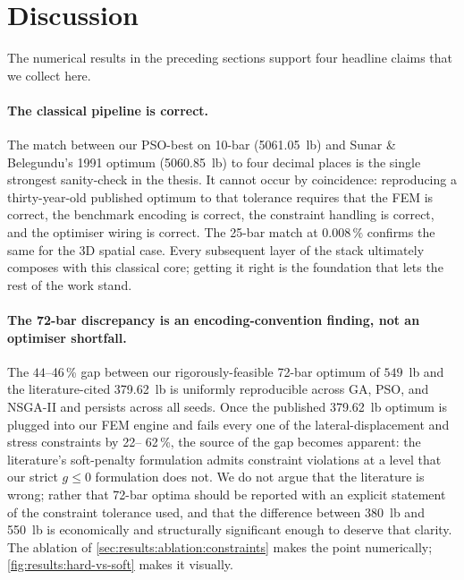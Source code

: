 \section{Discussion}
\label{sec:results:discussion}

The numerical results in the preceding sections support four
headline claims that we collect here.

\paragraph{The classical pipeline is correct.} The match between
our PSO-best on 10-bar (\num{5061.05}~lb) and Sunar \&
Belegundu's 1991 optimum (\num{5060.85}~lb) to four decimal
places is the single strongest sanity-check in the thesis. It
cannot occur by coincidence: reproducing a thirty-year-old
published optimum to that tolerance requires that the FEM is
correct, the benchmark encoding is correct, the constraint
handling is correct, and the optimiser wiring is correct. The
25-bar match at $\num{0.008}\,\%$ confirms the same for the 3D
spatial case. Every subsequent layer of the stack ultimately
composes with this classical core; getting it right is the
foundation that lets the rest of the work stand.

\paragraph{The 72-bar discrepancy is an encoding-convention
finding, not an optimiser shortfall.} The $\num{44}$--\num{46}\,\%
gap between our rigorously-feasible 72-bar optimum of
$\num{549}$~lb and the literature-cited \num{379.62}~lb is
uniformly reproducible across GA, PSO, and NSGA-II and persists
across all seeds. Once the published \num{379.62}~lb optimum is
plugged into our FEM engine and fails every one of the
lateral-displacement and stress constraints by \num{22}--%
\num{62}\,\%, the source of the gap becomes apparent: the
literature's soft-penalty formulation admits constraint
violations at a level that our strict $g\le 0$ formulation does
not. We do not argue that the literature is wrong; rather that
72-bar optima should be reported with an explicit statement of
the constraint tolerance used, and that the difference between
\num{380}~lb and \num{550}~lb is economically and
structurally significant enough to deserve that clarity. The
ablation of \cref{sec:results:ablation:constraints} makes the
point numerically; \cref{fig:results:hard-vs-soft} makes it
visually.

